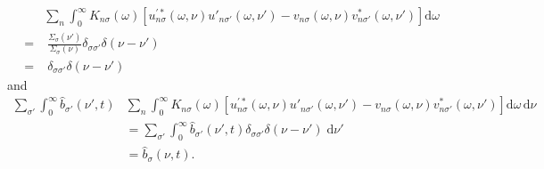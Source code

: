 \begin{equation}
\begin{split}
&\sum_n\int_0^\infty K_{n\sigma}(\omega)\left[u_{n\sigma}^{\prime*}(\omega,\nu)u'_{n\sigma'}(\omega,\nu') - v_{n\sigma}(\omega,\nu)v_{n\sigma'}^*(\omega,\nu')\right]\mathrm{d}\omega\\
= &\;\frac{\Sigma_\sigma(\nu')}{\Sigma_\sigma(\nu )}\delta_{\sigma\sigma'}\delta(\nu  - \nu')\\
= &\; \delta_{\sigma\sigma'}\delta(\nu - \nu')
\end{split}
\end{equation}
and
\begin{equation}
\begin{split}
\sum_{\sigma'}\int_0^\infty\hat{b}_{\sigma'}(\nu',t)&\sum_n\int_0^\infty K_{n\sigma}(\omega)\left[u_{n\sigma}^{\prime*}(\omega,\nu)u'_{n\sigma'}(\omega,\nu') - v_{n\sigma}(\omega,\nu)v_{n\sigma'}^*(\omega,\nu')\right]\mathrm{d}\omega\,\mathrm{d}\nu\\
&= \sum_{\sigma'}\int_0^\infty\hat{b}_{\sigma'}(\nu',t)\delta_{\sigma\sigma'}\delta(\nu - \nu')\;\mathrm{d}\nu'\\
&= \hat{b}_\sigma(\nu,t).
\end{split}
\end{equation}

